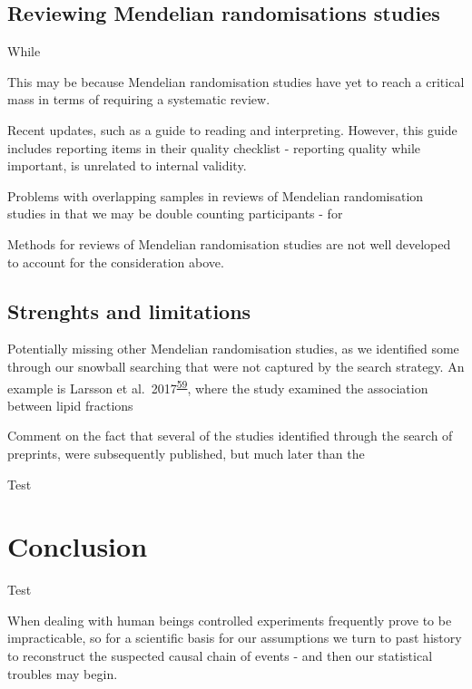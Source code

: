 \documentclass[a4paper, twoside]{templates/ociamthesis}
\begin{document}
\hypertarget{reviewing-mendelian-randomisations-studies}{%
\subsection{Reviewing Mendelian randomisations studies}\label{reviewing-mendelian-randomisations-studies}}

While

This may be because Mendelian randomisation studies have yet to reach a critical mass in terms of requiring a systematic review.

Recent updates, such as a guide to reading and interpreting. However, this guide includes reporting items in their quality checklist - reporting quality while important, is unrelated to internal validity.

Problems with overlapping samples in reviews of Mendelian randomisation studies in that we may be double counting participants - for

Methods for reviews of Mendelian randomisation studies are not well developed to account for the consideration above.

\hypertarget{strenghts-and-limitations}{%
\subsection{Strenghts and limitations}\label{strenghts-and-limitations}}

Potentially missing other Mendelian randomisation studies, as we identified some through our snowball searching that were not captured by the search strategy. An example is Larsson et al.~2017\textsuperscript{\protect\hyperlink{ref-larsson2017a}{59}}, where the study examined the association between lipid fractions

Comment on the fact that several of the studies identified through the search of preprints, were subsequently published, but much later than the

Test

\hypertarget{conclusion}{%
\section{Conclusion}\label{conclusion}}

Test

\begin{savequote}
When dealing with human beings controlled experiments frequently prove
to be impracticable, so for a scientific basis for our assumptions we
turn to past history to reconstruct the suspected causal chain of events
- and then our statistical troubles may begin.
\end{savequote}
\end{document}
